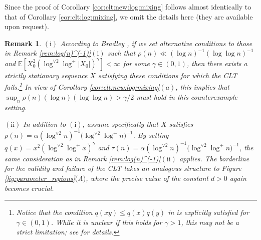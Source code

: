 \documentclass[11pt,a4,leqno]{amsart}
\newtheorem{remark}[lemma]{Remark}
\newcommand{\E }{{\mathbb E}}
\newcommand{\1}{{\mathbf 1}}
\begin{document}
Since the proof of Corollary \ref{cor:clt:new:log:mixing} follows almost identically 
to that of Corollary \ref{cor:clt:log:mixing}, we omit the details here (they are available upon request). 

\begin{remark}
\noindent $(\mathrm{i})$ According to Bradley \cite[Theorem 1]{bradley:1980}, 
if we set alternative conditions to those in Remark \ref{rem:log(n)^(-1)}$(\mathrm{i})$ such that 
$\rho(n) \ll (\log n)^{-1}(\log \log n)^{-1}$ and $\E [X_0^2 (\log^{\vee 2}\log^+ |X_0|)^\gamma] <\infty$ 
for some $\gamma\in (0,1)$, then there exists a strictly stationary sequence $X$ satisfying these conditions 
for which the CLT fails.\footnote{Notice that the condition $q(xy)\le q(x)q(y)$ in \cite[Theorem 1]{bradley:1980} 
is explicitly satisfied for $\gamma\in (0,1)$. While it is unclear if this holds for $\gamma>1$, this may not be a 
strict limitation; see \cite[p.99]{bradley:1980} for details.}
In view of Corollary \ref{cor:clt:new:log:mixing}$(a)$, this implies that 
$\sup_n \rho(n) (\log n) (\log\log n) > \gamma/2$ must hold in this counterexample setting.

\vspace{2mm}
\noindent $(\mathrm{ii})$ In addition to $(\mathrm{i})$, assume specifically that $X$ satisfies 
$\rho(n)=\alpha (\log^{\vee 2} n)^{-1}\big(\log^{\vee 2} \log^+ n \big)^{-1}$. By setting $q(x)=x^2 (\log^{\vee 2}\log^{+} x )^\gamma$ 
and $\tau(n)= \alpha (\log^{\vee 2} n)^{-1}\big(\log^{\vee 2} \log^+ n\big)^{-1}$, the same consideration as in 
Remark \ref{rem:log(n)^(-1)}$(\mathrm{ii})$ applies. The borderline for the validity and failure of the CLT takes 
an analogous structure to Figure \ref{fig:parameter_regions}$($A$)$, where the precise value of the constant $d>0$ again becomes crucial. 
\end{remark}
\end{document}
